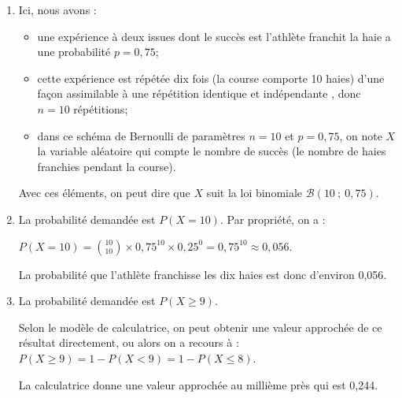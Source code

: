 \begin{enumerate}
\item Ici, nous avons :
\begin{itemize}
\item une expérience à deux issues  dont le succès est \og l'athlète  franchit la haie \fg{} a une probabilité $p = 0,75$;
\item cette expérience est répétée dix fois (la course comporte 10 haies) d'une façon assimilable à une répétition identique et indépendante , donc $n=10$ répétitions;
\item dans ce schéma de Bernoulli de paramètres $n=10$ et $p=0,75$, on note $X$ la variable aléatoire qui compte le nombre de succès (le nombre de haies franchies pendant la course).
\end{itemize}
Avec ces éléments, on peut dire que $X$ suit la loi binomiale $ \mathcal{B}\left(10 ~;~ 0,75\right) $.
\item La probabilité demandée est $P(X = 10)$. Par propriété, on a :

$\displaystyle P(X=10) = \binom{10}{10} \times 0,75^{10} \times 0,25^0 = 0,75^{10}\approx 0,056$.

La probabilité que l'athlète franchisse les dix haies est donc d'environ  0,056.

\item  La probabilité demandée est $P(X \geqslant 9)$.

Selon le modèle de calculatrice, on peut obtenir une valeur approchée de ce résultat directement, ou alors on a recours à : $P(X \geqslant 9) = 1 - P(X <9) = 1 - P(X \leqslant 8)$.

La calculatrice donne une valeur approchée au millième près qui est 0,244.
\end{enumerate}

\bigskip
